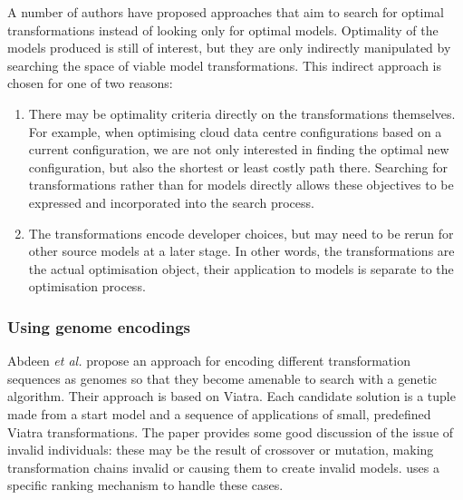 		A number of authors have proposed approaches that aim to search for optimal transformations instead of looking only for optimal models. Optimality of the
		models produced is still of interest, but they are only indirectly manipulated by searching the space of viable model transformations. This indirect approach
		is chosen for one of two reasons: 
		\begin{enumerate}
			\item There may be optimality criteria directly on the transformations themselves. For example, when optimising cloud data centre configurations based on a
			      current configuration, we are not only interested in finding the optimal new configuration, but also the shortest or least costly path there.
						Searching for transformations rather than for models directly allows these objectives to be expressed and incorporated into the search process.
		  \item The transformations encode developer choices, but may need to be rerun for other source models at a later stage. In other words, the transformations
			      are the actual optimisation object, their application to models is separate to the optimisation process.
		\end{enumerate}
			
		\subsubsection{Using genome encodings}
	
			
			Abdeen \emph{et al.} \cite{Abdeen+14} propose an approach for encoding different transformation sequences as genomes so that they become amenable to search
			with a genetic algorithm. Their approach is based on Viatra. Each candidate solution is a tuple made from a start model and a sequence of applications of
			small, predefined Viatra transformations. The paper provides some good discussion of the issue of invalid individuals: these may be the result of crossover
			or mutation, making transformation chains invalid or causing them to create invalid models. \cite{Abdeen+14} uses a specific ranking mechanism to handle
			these cases.
			
